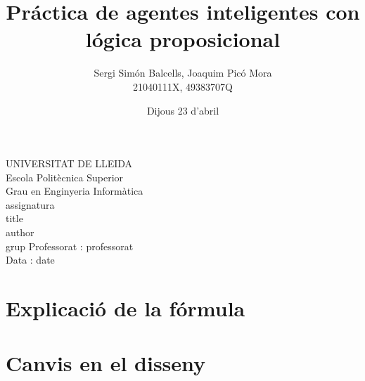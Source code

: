 \documentclass{article}
\title{Práctica de agentes inteligentes con lógica proposicional}
\author{Sergi Simón Balcells, Joaquim Picó Mora\\21040111X, 49383707Q}
\date{Dijous 23 d'abril}
\renewcommand{\maketitle}{ %
	\begin{titlepage}
		\raggedright{UNIVERSITAT DE LLEIDA \\
			Escola Politècnica Superior \\
			Grau en Enginyeria Informàtica\\
			\1assignatura\\}
		\vspace{5cm}
		\centering\huge{\5title \\}
		\vspace{3cm}
		\large{\6author} \\
		\normalsize{\3grup}
		\vfill
		Professorat : \4professorat \\
		Data : \7date
\end{titlepage}}
\begin{document}
	\maketitle
	\thispagestyle{empty}
	
	\newpage
	\tableofcontents
	\newpage
	\section{Explicació de la fórmula}
	
	\section{Canvis en el disseny}
	
\end{document}
